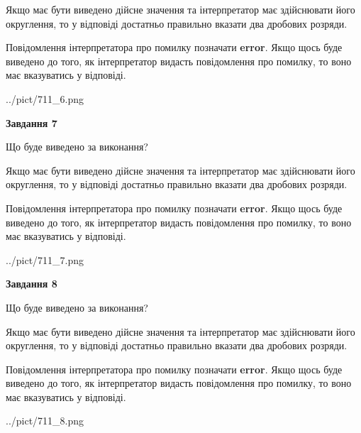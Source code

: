 \documentclass[12pt, ukrainian]{article}
\begin{document}
{\begin {Large}
Якщо має бути виведено дійсне значення та інтерпретатор має здійснювати його округлення, 
то у відповіді достатньо правильно вказати два дробових розряди.

Повідомлення інтерпретатора про помилку позначати \textbf{error}.
Якщо щось буде виведено до того, як інтерпретатор видасть повідомлення про помилку, 
то воно має вказуватись у відповіді. \par

\begin{center}
	{../pict/711_6.png}
\end{center}
\newpage

{\begin {center}\textbf{Завдання 7}\end {center}}\par
Що буде виведено за виконання? \par

Якщо має бути виведено дійсне значення та інтерпретатор має здійснювати його округлення, 
то у відповіді достатньо правильно вказати два дробових розряди.

Повідомлення інтерпретатора про помилку позначати \textbf{error}.
Якщо щось буде виведено до того, як інтерпретатор видасть повідомлення про помилку, 
то воно має вказуватись у відповіді. \par

\begin{center}
	{../pict/711_7.png}
\end{center}
\newpage

{\begin {center}\textbf{Завдання 8}\end {center}}\par
Що буде виведено за виконання? \par

Якщо має бути виведено дійсне значення та інтерпретатор має здійснювати його округлення, 
то у відповіді достатньо правильно вказати два дробових розряди.

Повідомлення інтерпретатора про помилку позначати \textbf{error}.
Якщо щось буде виведено до того, як інтерпретатор видасть повідомлення про помилку, 
то воно має вказуватись у відповіді. \par

\begin{center}
	{../pict/711_8.png}
\end{center}
\newpage


\end{Large}}
\end{document}
